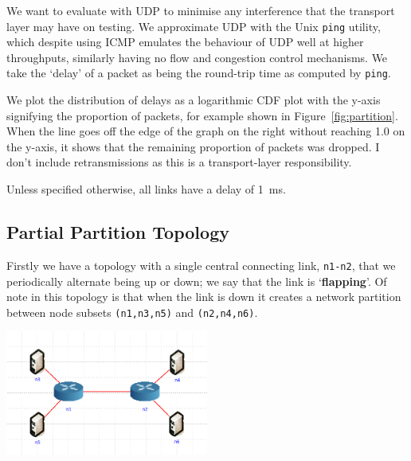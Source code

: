 \documentclass[withindex,glossary,openany]{cam-thesis}
\begin{document}
We want to evaluate with UDP to minimise any interference that the transport layer may have on testing. We approximate UDP with the Unix \texttt{ping} utility, which despite using ICMP emulates the behaviour of UDP well at higher throughputs, similarly having no flow and congestion control mechanisms. We take the `delay' of a packet as being the round-trip time as computed by \texttt{ping}.


We plot the distribution of delays as a logarithmic CDF plot with the y-axis signifying the proportion of packets, for example shown in Figure~\ref{fig:partition}. When the line goes off the edge of the graph on the right without reaching 1.0 on the y-axis, it shows that the remaining proportion of packets was dropped. I don't include retransmissions as this is a transport-layer responsibility.

Unless specified otherwise, all links have a delay of \SI{1}{\ms}.

\subsection{Partial Partition Topology}

Firstly we have a topology with a single central connecting link, \texttt{n1-n2}, that we periodically alternate being up or down; we say that the link is `\textbf{flapping}'. Of note in this topology is that when the link is down it creates a network partition between node subsets \texttt{(n1,n3,n5)} and \texttt{(n2,n4,n6)}.

\begin{minipage}{1\textwidth} \centering
	\includegraphics[width=0.5\textwidth]{delay_partition_topology}
	\label{fig:partition_topology}
\end{minipage}
\end{document}

